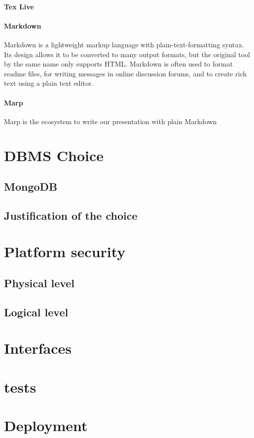 \paragraph{Tex Live}



\paragraph{Markdown}
Markdown is a lightweight markup language with plain-text-formatting syntax. Its design allows it to be converted to many output formats, but the original tool by the same name only supports HTML. Markdown is often used to format readme files, for writing messages in online discussion forums, and to create rich text using a plain text editor.
\paragraph{Marp}
Marp is the ecosystem to write our presentation with plain Markdown
\section{DBMS Choice}
\subsection{MongoDB}
\subsection{Justification of the choice}

\section{Platform security}
\subsection{Physical level}
\subsection{Logical level}

\section{Interfaces}
\section{tests}
\section{Deployment}



